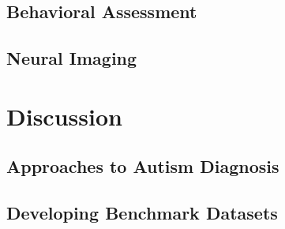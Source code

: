 \documentclass[letterpaper]{article}
\begin{document}
\subsection{Behavioral Assessment}
\subsection{Neural Imaging}

\section{Discussion}
\subsection{Approaches to Autism Diagnosis}
\subsection{Developing Benchmark Datasets}


\newpage
\printbibliography[heading=bibintoc, title={Bibliography}]
\end{document}
